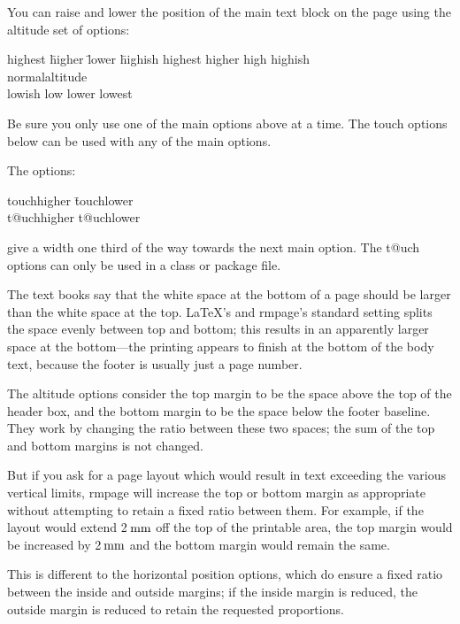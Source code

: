 \documentclass[11pt,loose,twoside,touchwider,longish,
                      noheaders,a4paper,notstdmargins]{report}
\makeatletter
\newcommand*{\unit}[1]{\ifmmode\@unit{\hbox{#1}}\else$\@unit{\hbox{#1}}$\fi}%
\let\units=\unit
\def\@unit#1{{\setbox0=\hbox{#1}\ifdim\wd0<1.125em\,\else\>\fi\box0}}
\newcommand*{\classname}[1]{{\ttfamily #1}}
\newcommand*{\optname}[1]{{\ttfamily #1}}
\newcommand*{\rmpage}{\classname{rmpage}\xspace}
\makeatother
\begin{document}
You can raise and lower the position of the main text block on the page
using the altitude set of options:
\begin{tabbing}
\optname{highest} \= \optname{higher} \= \optname{lower} \= \optname{highish} \kill
\optname{highest} \> \optname{higher} \>  \optname{high} \> \optname{highish}\\
\optname{normalaltitude}\\
\optname{lowish}  \> \optname{low} \>  \optname{lower} \>  \optname{lowest}
\end{tabbing}
Be sure you only use one of the main options above at a time.  The
\optname{touch} options below can be used with any of the main options.

The options:
\begin{tabbing}
\optname{touchhigher} \= \optname{touchlower} \\
\optname{t@uchhigher} \> \optname{t@uchlower}
\end{tabbing}
give a width one third of the way towards the next main option.  The
\optname{t@uch} options can only be used in a class or package file.

The text books say that the white space at the bottom of a page should
be larger than the white space at the top.  \LaTeX's and \rmpage's
standard setting splits the space evenly between top and bottom; this
results in an apparently larger space at the bottom---the printing
appears to finish at the bottom of the body text, because the footer
is usually just a page number.

The altitude options consider the top margin to be the space above the
top of the header box, and the bottom margin to be the space below the
footer baseline.  They work by changing the ratio between these two
spaces; the sum of the top and bottom margins is not changed.

But if you ask for a page layout which would result in text exceeding
the various vertical limits, \rmpage will increase the top or bottom
margin as appropriate without attempting to retain a fixed ratio
between them.  For example, if the layout would extend 2\units{mm} off
the top of the printable area, the top margin would be increased by
2\units{mm} and the bottom margin would remain the same.

This is different to the horizontal position options, which do ensure
a fixed ratio between the inside and outside margins; if the inside
margin is reduced, the outside margin is reduced to retain the
requested proportions.
\end{document}
